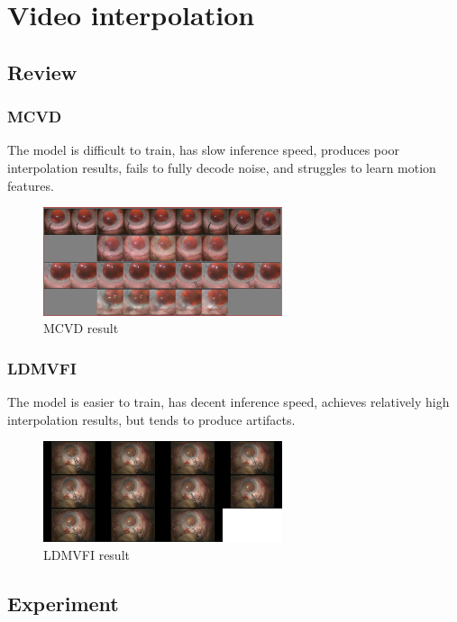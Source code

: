 \documentclass[lettersize,journal]{IEEEtran}
\begin{document}
\section{Video interpolation}
\subsection{Review}

\subsubsection{MCVD}
The model is difficult to train, has slow inference speed, produces poor interpolation results, fails to fully decode noise, and struggles to learn motion features.
\begin{figure}[h!]
    \centering
    \includegraphics[width=7cm]{Image/MCVD result.png}
    \caption{MCVD result}
    \label{fig-sample}
\end{figure}

\subsubsection{LDMVFI}
The model is easier to train, has decent inference speed, achieves relatively high interpolation results, but tends to produce artifacts.
\begin{figure}[h!]
    \centering
    \includegraphics[width=7cm]{Image/LDMVFI result.png}
    \caption{LDMVFI result}
    \label{fig-sample}
\end{figure}

\subsection{Experiment}
\end{document}
